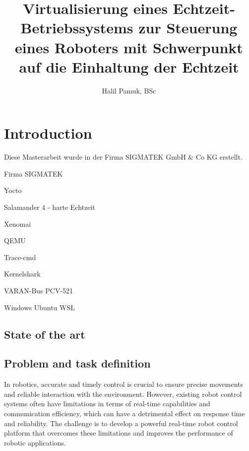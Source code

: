 \documentclass[MMR,Master,english]{twbook}
\title{Virtualisierung eines Echtzeit-Betriebssystems zur Steuerung eines Roboters mit Schwerpunkt auf die
Einhaltung der Echtzeit}
\author{Halil Pamuk, BSc}
\begin{document}
\maketitle

%
%
%


\chapter{Introduction}
Diese Masterarbeit wurde in der Firma SIGMATEK GmbH \& Co KG erstellt. 

Firma SIGMATEK

Yocto

Salamander 4 - harte Echtzeit

Xenomai

QEMU

Trace-cmd

Kernelshark

VARAN-Bus PCV-521

Windows
Ubuntu
WSL



\clearpage
\section{State of the art}

\clearpage
\section{Problem and task definition}
In robotics, accurate and timely control is crucial to ensure precise movements and reliable interaction with the environment. However, existing robot control systems often have limitations in terms of real-time capabilities and communication efficiency, which can have a detrimental effect on response time and reliability. The challenge is to develop a powerful real-time robot control platform that overcomes these limitations and improves the performance of robotic applications.
\end{document}

